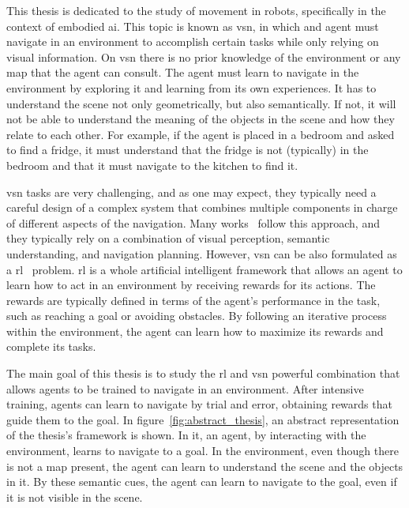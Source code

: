 This thesis is dedicated to the study of movement in robots, specifically in the context of embodied \acrshort{ai}.
This topic is known as \acrfull{vsn}, in which and agent must navigate in an environment to accomplish certain tasks while only relying on visual information.
On \acrshort{vsn} there is no prior knowledge of the environment or any map that the agent can consult.
The agent must learn to navigate in the environment by exploring it and learning from its own experiences.
It has to understand the scene not only geometrically, but also semantically.
If not, it will not be able to understand the meaning of the objects in the scene and how they relate to each other.
For example, if the agent is placed in a bedroom and asked to find a fridge, it must understand that the fridge is not (typically) in the bedroom and that it must navigate to the kitchen to find it.

\acrshort{vsn} tasks are very challenging, and as one may expect, they typically need a careful design of a complex system that combines multiple components in charge of different aspects of the navigation.
Many works~\cite{newcombe2011, thrun2001, jones2011, sattler2018, Kazerouni2022, campos2021, labbe2022, zhang2018, rosinol2020, jin2023} follow this approach, and they typically rely on a combination of visual perception, semantic understanding, and navigation planning.
However, \acrshort{vsn} can be also formulated as a \acrfull{rl}~\cite{sutton2018} problem.
\acrshort{rl} is a whole artificial intelligent framework that allows an agent to learn how to act in an environment by receiving rewards for its actions.
The rewards are typically defined in terms of the agent's performance in the task, such as reaching a goal or avoiding obstacles.
By following an iterative process within the environment, the agent can learn how to maximize its rewards and complete its tasks.

The main goal of this thesis is to study the \acrshort{rl} and \acrshort{vsn} powerful combination that allows agents to be trained to navigate in an environment.
After intensive training, agents can learn to navigate by trial and error, obtaining rewards that guide them to the goal.
In figure~\ref{fig:abstract_thesis}, an abstract representation of the thesis's framework is shown.
In it, an agent, by interacting with the environment, learns to navigate to a goal.
In the environment, even though there is not a map present, the agent can learn to understand the scene and the objects in it.
By these semantic cues, the agent can learn to navigate to the goal, even if it is not visible in the scene.

